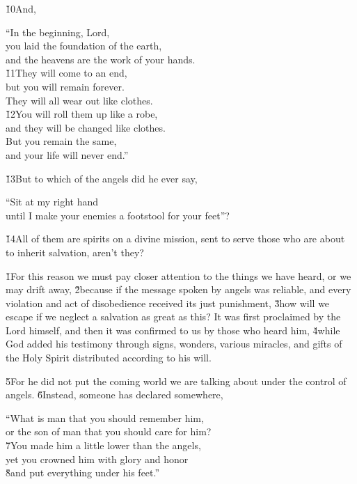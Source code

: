 \v{10}And,

\begin{poetry}
\poeml ``In the beginning, Lord, \\
\poemll    you laid the foundation of the earth, \\
\poemlll       and the heavens are the work of your hands. \\
\poeml \v{11}They will come to an end, \\
\poemll    but you will remain forever. \\
\poemlll       They will all wear out like clothes. \\
\poeml \v{12}You will roll them up like a robe, \\
\poemll    and they will be changed like clothes. \\
\poeml But you remain the same, \\
\poemll    and your life will never end.''
\end{poetry}

\v{13}But to which of the angels did he ever say,

\begin{poetry}
\poeml ``Sit at my right hand \\
\poemll    until I make your enemies a footstool for your feet''?
\end{poetry}

\v{14}All of them are spirits on a divine mission, sent to serve those who are about to inherit salvation, aren't they?

\v{1}For this reason we must pay closer attention to the things we have heard, or we may drift away, \v{2}because if the message spoken by angels was reliable, and every violation and act of disobedience received its just punishment, \v{3}how will we escape if we neglect a salvation as great as this? It was first proclaimed by the Lord himself, and then it was confirmed to us by those who heard him, \v{4}while God added his testimony through signs, wonders, various miracles, and gifts of the Holy Spirit distributed according to his will.

\v{5}For he did not put the coming world we are talking about under the control of angels. \v{6}Instead, someone has declared somewhere,

\begin{poetry}
\poeml ``What is man that you should remember him, \\
\poemll    or the son of man that you should care for him? \\
\poeml \v{7}You made him a little lower than the angels, \\
\poemll    yet you crowned him with glory and honor \\
\poeml \v{8}and put everything under his feet.''
\end{poetry}

